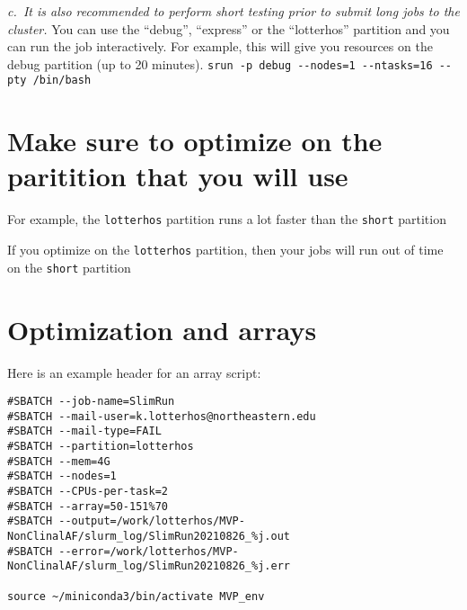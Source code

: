 \documentclass[
  letterpaper,
  DIV=11,
  numbers=noendperiod]{scrreprt}
\begin{document}
\emph{c.~It is also recommended to perform short testing prior to submit
long jobs to the cluster.} You can use the ``debug'', ``express'' or the
``lotterhos'' partition and you can run the job interactively. For
example, this will give you resources on the debug partition (up to 20
minutes).
\texttt{srun\ -p\ debug\ -\/-nodes=1\ -\/-ntasks=16\ -\/-pty\ /bin/bash}

\hypertarget{make-sure-to-optimize-on-the-paritition-that-you-will-use}{%
\section*{\texorpdfstring{\textbf{Make sure to optimize on the
paritition that you will
use}}{Make sure to optimize on the paritition that you will use}}\label{make-sure-to-optimize-on-the-paritition-that-you-will-use}}


For example, the \texttt{lotterhos} partition runs a lot faster than the
\texttt{short} partition

If you optimize on the \texttt{lotterhos} partition, then your jobs will
run out of time on the \texttt{short} partition

\hypertarget{optimization-and-arrays}{%
\section*{\texorpdfstring{\textbf{Optimization and
arrays}}{Optimization and arrays}}\label{optimization-and-arrays}}


Here is an example header for an array script:

\begin{verbatim}
#SBATCH --job-name=SlimRun
#SBATCH --mail-user=k.lotterhos@northeastern.edu
#SBATCH --mail-type=FAIL
#SBATCH --partition=lotterhos
#SBATCH --mem=4G
#SBATCH --nodes=1
#SBATCH --CPUs-per-task=2
#SBATCH --array=50-151%70
#SBATCH --output=/work/lotterhos/MVP-NonClinalAF/slurm_log/SlimRun20210826_%j.out
#SBATCH --error=/work/lotterhos/MVP-NonClinalAF/slurm_log/SlimRun20210826_%j.err

source ~/miniconda3/bin/activate MVP_env
\end{verbatim}
\end{document}
